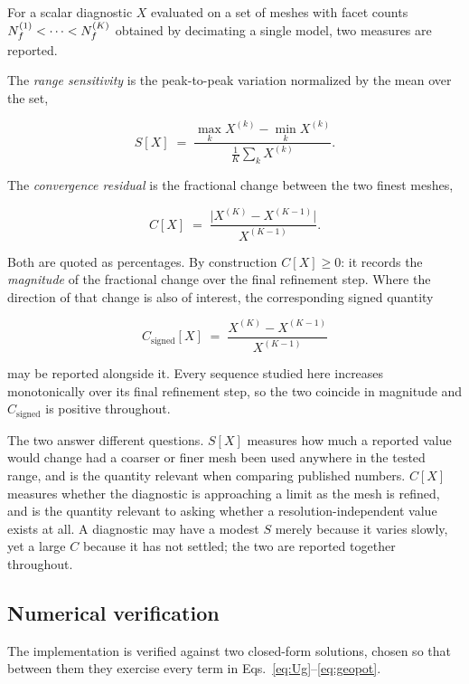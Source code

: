 For a scalar diagnostic $X$ evaluated on a set of meshes with facet counts
$N_{f}^{(1)}<\dots<N_{f}^{(K)}$ obtained by decimating a single model, two measures
are reported.

The \emph{range sensitivity} is the peak-to-peak variation normalized by the
mean over the set,

\begin{equation}
S[X] \;=\; \frac{\max_{k} X^{(k)} - \min_{k} X^{(k)}}
{\tfrac{1}{K}\sum_{k} X^{(k)}}.
\label{eq:sens}
\end{equation}

The \emph{convergence residual} is the fractional change between the two finest
meshes,

\begin{equation}
C[X] \;=\;
\frac{\bigl\lvert X^{(K)} - X^{(K-1)} \bigr\rvert}{X^{(K-1)}}.
\label{eq:conv}
\end{equation}

Both are quoted as percentages. By construction $C[X]\ge 0$: it records the
\emph{magnitude} of the fractional change over the final refinement step. Where
the direction of that change is also of interest, the corresponding signed
quantity

\begin{equation}
C_{\mathrm{signed}}[X] \;=\;
\frac{X^{(K)} - X^{(K-1)}}{X^{(K-1)}}
\label{eq:convsigned}
\end{equation}

may be reported alongside it. Every sequence studied here increases
monotonically over its final refinement step, so the two coincide in magnitude
and $C_{\mathrm{signed}}$ is positive throughout.

The two answer different questions. $S[X]$ measures how much a reported value
would change had a coarser or finer mesh been used anywhere in the tested range,
and is the quantity relevant when comparing published numbers. $C[X]$ measures
whether the diagnostic is approaching a limit as the mesh is refined, and is
the quantity relevant to asking whether a resolution-independent value exists
at all. A diagnostic may have a modest $S$ merely because it varies slowly, yet
a large $C$ because it has not settled; the two are reported together
throughout.

\subsection{Numerical verification}
\label{sec:numval}

The implementation is verified against two closed-form solutions, chosen so
that between them they exercise every term in
Eqs.~\eqref{eq:Ug}--\eqref{eq:geopot}.

